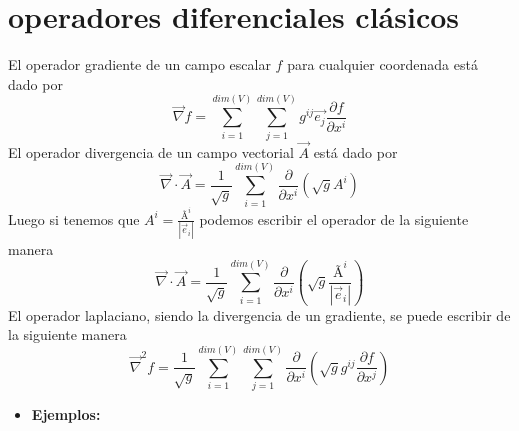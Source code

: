 \documentclass[../main.tex]{subfiles}
\begin{document}
\section{operadores diferenciales clásicos}

El operador gradiente de un campo escalar $f$ para cualquier coordenada está dado por
\begin{equation}
    \vec{\nabla}f=\sum_{i=1}^{dim({V})}\sum_{j=1}^{dim({V})} g^{ij}\vec{e_j}\frac{\partial f}{\partial x^i}
\end{equation}
El operador divergencia de un campo vectorial $\vec{A}$ está dado por
\begin{equation}
    \vec{\nabla}\cdot\vec{A}=
    \frac{1}{\sqrt{g}}\sum_{i=1}^{dim(V)}
    \frac{\partial}{\partial{x^i}} \left( \sqrt{g}A^i \right)
\end{equation}
Luego si tenemos que $A^i=\frac{{\text{\~{A}}}^i}{|\vec{e}_i|}$ podemos escribir el operador de la siguiente manera
\begin{equation}
    \vec{\nabla}\cdot\vec{A}=
    \frac{1}{\sqrt{g}}\sum_{i=1}^{dim(V)}
    \frac{\partial}{\partial{x^i}} \left( \sqrt{g}\frac{{\text{\~{A}}}^i}{|\vec{e}_i|} \right)
\end{equation}
El operador laplaciano, siendo la divergencia de un gradiente, se puede escribir de la siguiente manera
\begin{equation}
    \vec{\nabla}^2f=\frac{1}{\sqrt{g}}\sum_{i=1}^{dim({V})}\sum_{j=1}^{dim({V})} \frac{\partial}{\partial{x^i}} \left( \sqrt{g} g^{ij} \frac{\partial f}{\partial x^j}\right)
\end{equation}

\begin{itemize}
    \item \textbf{Ejemplos:}
\end{itemize}

\end{document}
